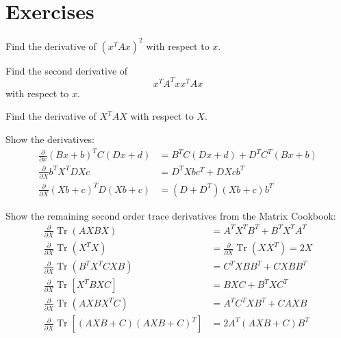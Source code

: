 \section{Exercises}
\begin{exercise}
   Find the derivative of \((x^T A x)^2\) with respect to $x$.
\end{exercise}

\begin{exercise}
   Find the second derivative of
   \[
      x^T A^T x x^T A x
   \]
   with respect to $x$.
\end{exercise}

\begin{exercise}
   Find the derivative of \(X^T A X\) with respect to $X$.
\end{exercise}

\begin{exercise}
   Show the derivatives:
   \begin{align*}
   \tag{78}
   \frac{\partial}{\partial x} (Bx+b)^T C (Dx+d)
   &= B^TC(Dx+d) + D^TC^T(Bx+b)
   \\
   \tag{82}
   \frac{\partial}{\partial X} b^T X^T D X c
   &= D^T X b c^T + DXcb^T
   \\
   \tag{83}
   \frac{\partial}{\partial X} (Xb+c)^T D (Xb+c)
   &= (D+D^T)(Xb+c)b^T
   \end{align*}
\end{exercise}

\begin{exercise}
   Show the remaining second order trace derivatives from the Matrix Cookbook:
   \begin{align*}
      \tag{114}
   \frac{\partial}{\partial X} \operatorname{Tr}(A X B X)
   &=A^T X^T B^T+B^T X^T A^T
   \\
   \tag{115}
   \frac{\partial}{\partial X} \operatorname{Tr}\left(X^T X\right)
   &=\frac{\partial}{\partial X} \operatorname{Tr}\left(X X^T\right)=2 X
   \\
   \tag{116}
   \frac{\partial}{\partial X} \operatorname{Tr}\left(B^T X^T C X B\right)
   &=C^T X B B^T+C X B B^T
   \\
   \tag{117}
   \frac{\partial}{\partial X} \operatorname{Tr}\left[X^T B X C\right]
   &=B X C+B^T X C^T
   \\
   \tag{118}
   \frac{\partial}{\partial X} \operatorname{Tr}\left(A X B X^T C\right)
   &=A^T C^T X B^T+C A X B
   \\
   \tag{119}
   \frac{\partial}{\partial X} \operatorname{Tr}\left[(A X B+C)(A X B+C)^T\right]
   &=2 A^T(A X B+C) B^T
   \\
   \end{align*}
\end{exercise}

